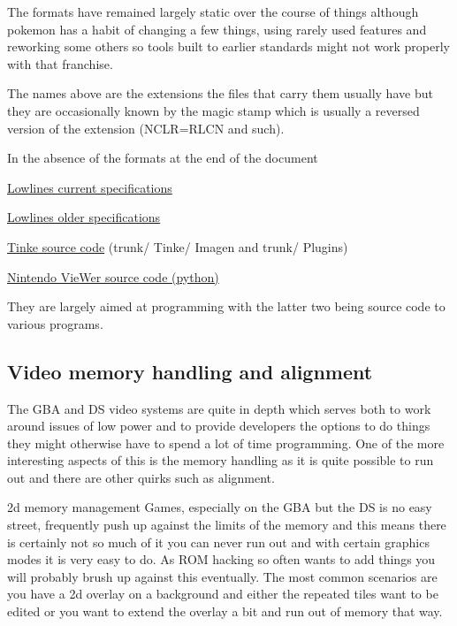 \documentclass[
]{book}
\begin{document}
The formats have remained largely static over the course of things although pokemon has a habit of changing a few things, using rarely used features and reworking some others so tools built to earlier standards might not work properly with that franchise.

The names above are the extensions the files that carry them usually have but they are occasionally known by the magic stamp which is usually a reversed version of the extension (NCLR=RLCN and such).

In the absence of the formats at the end of the document

\href{http://llref.emutalk.net/docs/}{Lowlines current specifications}

\href{http://www.romhacking.net/documents/469/}{Lowlines older specifications}

\href{https://github.com/pleonex/tinke/tree/master/Tinke}{Tinke source code} (trunk/ Tinke/ Imagen and trunk/ Plugins)

\href{http://nvwr.googlecode.com/svn/trunk/libs/formats/}{Nintendo VieWer source code (python)}

They are largely aimed at programming with the latter two being source code to various programs.

\hypertarget{video-memory-handling-and-alignment}{%
\subsection{Video memory handling and alignment}\label{video-memory-handling-and-alignment}}

The GBA and DS video systems are quite in depth which serves both to work around issues of low power and to provide developers the options to do things they might otherwise have to spend a lot of time programming. One of the more interesting aspects of this is the memory handling as it is quite possible to run out and there are other quirks such as alignment.

2d memory management Games, especially on the GBA but the DS is no easy street, frequently push up against the limits of the memory and this means there is certainly not so much of it you can never run out and with certain graphics modes it is very easy to do. As ROM hacking so often wants to add things you will probably brush up against this eventually. The most common scenarios are you have a 2d overlay on a background and either the repeated tiles want to be edited or you want to extend the overlay a bit and run out of memory that way.
\end{document}
